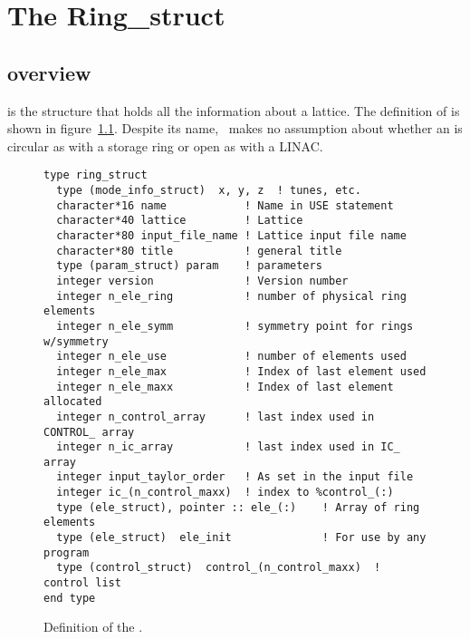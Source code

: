 \chapter{The Ring\_struct}


\section{overview}

 is the structure that holds all the information 
about a lattice.  The definition of  is shown in
figure~\ref{f:ring_struct}. Despite its name, \bmad\
makes no assumption about whether an  is circular as
with a storage ring or open as with a LINAC.

\begin{figure}[tb]
\centering
\begin{verbatim}
type ring_struct
  type (mode_info_struct)  x, y, z  ! tunes, etc.
  character*16 name            ! Name in USE statement
  character*40 lattice         ! Lattice
  character*80 input_file_name ! Lattice input file name
  character*80 title           ! general title
  type (param_struct) param    ! parameters
  integer version              ! Version number
  integer n_ele_ring           ! number of physical ring elements
  integer n_ele_symm           ! symmetry point for rings w/symmetry
  integer n_ele_use            ! number of elements used
  integer n_ele_max            ! Index of last element used
  integer n_ele_maxx           ! Index of last element allocated
  integer n_control_array      ! last index used in CONTROL_ array
  integer n_ic_array           ! last index used in IC_ array
  integer input_taylor_order   ! As set in the input file
  integer ic_(n_control_maxx)  ! index to %control_(:)
  type (ele_struct), pointer :: ele_(:)    ! Array of ring elements
  type (ele_struct)  ele_init              ! For use by any program
  type (control_struct)  control_(n_control_maxx)  ! control list
end type
\end{verbatim}
\caption{Definition of the .}
\label{f:ring_struct}
\end{figure}

